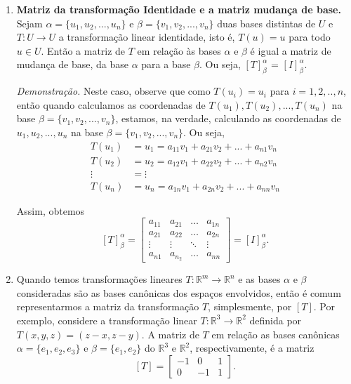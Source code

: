\begin{enumerate}
\item \textbf{Matriz da transformação Identidade e a matriz mudança de base.} Sejam $\alpha =\{u_1, u_2, ..., u_n\}$ e $\beta =\{v_1, v_2, ..., v_n\}$ duas bases distintas de $U$   e  $T:U \rightarrow U$ a transformação linear  identidade, isto é,   $T(u)=u$ para todo $u\in U$. Então a matriz de $T$ em relação às bases  $\alpha$ e  $\beta$ é igual a matriz de mudança de base, da base $\alpha$ para a base  $\beta$. Ou seja,  $[T]_{\beta}^{\alpha}$ = $[I]_{\beta}^{\alpha}$.

\noindent\textit{Demonstração.}  Neste caso, observe que como $T(u_i)=u_i$ para $i=1,2,..,n$, então quando calculamos as coordenadas de  $T(u_1), T(u_2),..., T(u_n)$ na base $\beta =\{v_1, v_2, ..., v_n\}$, estamos,  na verdade, calculando as coordenadas de  $u_1, u_2,..., u_n $ na base $\beta =\{v_1, v_2, ..., v_n\}$. Ou seja,
\begin{align*}
T(u_1)&=u_1=a_{11}v_1+ a_{21}v_2+ ...+a_{n1}v_n \\
T(u_2)&=u_2=a_{12}v_1+ a_{22}v_2+ ...+a_{n2}v_n  \\
      \vdots&= \vdots \\
T(u_n)&=u_n=a_{1n}v_1+ a_{2n}v_2+ ...+a_{nn}v_n
\end{align*}

Assim,  obtemos $$[T]_{\beta}^{\alpha}=\left[ \begin{array}{cccc}a_{11} &a_{21} & \hdots & a_{1n} \\ a_{21} & a_{22} & \hdots & a_{2n} \\ \vdots & \vdots & \ddots & \vdots \\ a_{n1}& a_{n_2} & \hdots & a_{nn} \end{array} \right]=[I]_{\beta}^{\alpha}.$$

\vspace{0.5cm}
\item Quando temos transformações lineares  $T: \mathbb{R}^{m} \rightarrow \mathbb{R}^{n}$  e as bases $\alpha$ e $\beta$  consideradas são as bases canônicas dos espaços envolvidos, então é comum representarmos a matriz da transformação $T$, simplesmente, por $[T]$. Por exemplo, considere  a transformação linear $T: \mathbb{R}^{3} \rightarrow \mathbb{R}^{2}$ definida por $T(x,y,z)= (z-x, z-y)$. A matriz de $T$ em relação as bases canônicas  $\alpha =\{ e_1, e_2, e_3\}$ e  $\beta =\{ e_1, e_2\}$ do $\mathbb{R}^{3}$ e  $\mathbb{R}^{2}$, respectivamente, é a  matriz
 $$[T]=\left[ \begin{array}{ccc} -1 & 0 & 1 \\ 0 & -1 & 1 \end{array} \right].$$


\end{enumerate}
